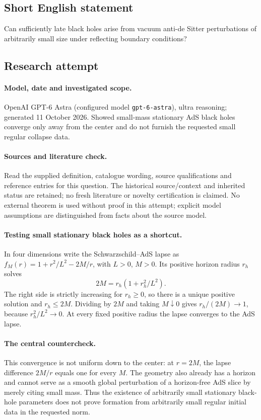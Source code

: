 \documentclass[11pt]{article}
\begin{document}
\subsection{Short English statement}
Can sufficiently late black holes arise from vacuum anti-de Sitter perturbations of arbitrarily small size under reflecting boundary conditions?
\subsection{Research attempt}
\paragraph{Model, date and investigated scope.}
OpenAI GPT-6 Astra (configured model \texttt{gpt-6-astra}), ultra reasoning; generated 11 October 2026. Showed small-mass stationary AdS black holes converge only away from the center and do not furnish the requested small regular collapse data.

\paragraph{Sources and literature check.}
Read the supplied definition, catalogue wording, source qualifications and reference entries for this question. The historical source/context and inherited status are retained; no fresh literature or novelty certification is claimed. No external theorem is used without proof in this attempt; explicit model assumptions are distinguished from facts about the source model.

\paragraph{Testing small stationary black holes as a shortcut.} In four dimensions write the Schwarzschild--AdS lapse as \(f_M(r)=1+r^2/L^2-2M/r\), with \(L>0\), \(M>0\). Its positive horizon radius \(r_h\) solves
\[
 2M=r_h(1+r_h^2/L^2).
\]
The right side is strictly increasing for \(r_h\ge0\), so there is a unique positive solution and \(r_h\le2M\). Dividing by \(2M\) and taking \(M\downarrow0\) gives \(r_h/(2M)\to1\), because \(r_h^2/L^2\to0\). At every fixed positive radius the lapse converges to the AdS lapse.
\paragraph{The central countercheck.} This convergence is not uniform down to the center: at \(r=2M\), the lapse difference \(2M/r\) equals one for every \(M\). The geometry also already has a horizon and cannot serve as a smooth global perturbation of a horizon-free AdS slice by merely citing small mass. Thus the existence of arbitrarily small stationary black-hole parameters does not prove formation from arbitrarily small regular initial data in the requested norm.
\end{document}

